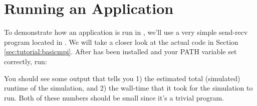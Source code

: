 %
%
%
%

\section{Running an Application}
\label{sec:tutorial:runapp}

To demonstrate how an application is run in \sstmacro, we'll use a very simple send-recv program located in .  We will take a closer look at the actual code in Section \ref{sec:tutorial:basicmpi}.
After \sstmacro has been installed and your PATH variable set correctly, run: 


You should see some output that tells you 1) the estimated total (simulated) runtime of the simulation, and 
2) the wall-time that it took for the simulation to run.  
Both of these numbers should be small since it's a trivial program. 

